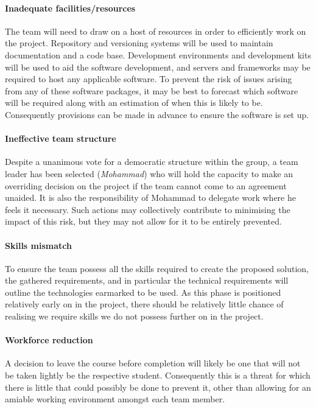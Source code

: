 \paragraph{Inadequate facilities/resources}
The team will need to draw on a host of resources in order to efficiently work
on the project. Repository and versioning systems will be used to maintain
documentation and a code base. Development environments and development kits
will be used to aid the software development, and servers and frameworks may be
required to host any applicable software. To prevent the risk of issues arising
from any of these software packages, it may be best to forecast which software
will be required along with an estimation of when this is likely to be.
Consequently provisions can be made in advance to ensure the software is set up.

\paragraph{Ineffective team structure}
Despite a unanimous vote for a democratic structure within the group, a team
leader has been selected (\emph{Mohammad}) who will hold the capacity to make an
overriding decision on the project if the team cannot come to an agreement
unaided. It is also the responsibility of Mohammad to delegate work where he
feels it necessary. Such actions may collectively contribute to minimising the
impact of this risk, but they may not allow for it to be entirely prevented.

\paragraph{Skills mismatch}
To ensure the team possess all the skills required to create the proposed
solution, the gathered requirements, and in particular the technical
requirements will outline the technologies earmarked to be used. As this phase
is positioned relatively early on in the project, there should be relatively
little chance of realising we require skills we do not possess further on in the
project.

\paragraph{Workforce reduction}
A decision to leave the course before completion will likely be one that will
not be taken lightly be the respective student. Consequently this is a threat
for which there is little that could possibly be done to prevent it, other than
allowing for an amiable working environment amongst each team member.


